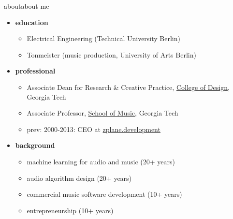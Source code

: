 \begin{frame}{about}{about me}
    \begin{itemize}
        \item   \textbf{education}
            \begin{itemize}
                \item   Electrical Engineering (Technical University Berlin)
                \item   Tonmeister (music production, University of Arts Berlin)
            \end{itemize}
        \bigskip
        \item   \textbf{professional}
            \begin{itemize}
                \item   Associate Dean for Research \& Creative Practice, \href{https://design.gatech.edu}{College of Design}, Georgia Tech 
                \item   Associate Professor, \href{https://music.gatech.edu}{School of Music}, Georgia Tech
                \item   prev: 2000-2013: CEO at \href{https://www.zplane.de}{zplane.development}
            \end{itemize}
        \bigskip
        \item   \textbf{background}
            \begin{itemize}
                \item   machine learning for audio and music (20+ years)
                \item   audio algorithm design (20+ years)
                \item   commercial music software development (10+ years)
                \item   entrepreneurship (10+ years)
            \end{itemize}
    \end{itemize}
    
\end{frame}
